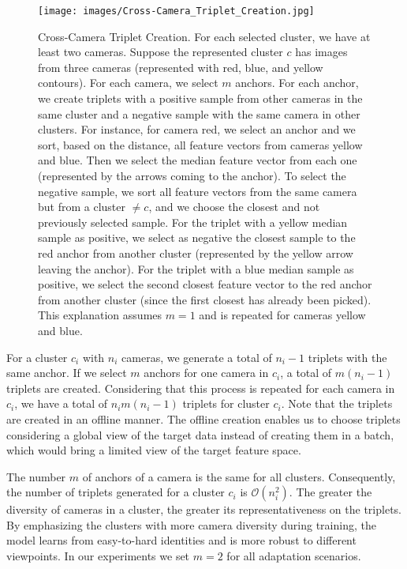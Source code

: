\documentclass[journal]{IEEEtran}
\begin{document}
\begin{figure}[ht]
\centering
\texttt{[image: images/Cross-Camera\_Triplet\_Creation.jpg]}
\caption{Cross-Camera Triplet Creation. For each selected cluster, we have at least two cameras. Suppose the represented cluster $c$ has images from three cameras (represented with red, blue, and yellow contours). For each camera, we select $m$ anchors. For each anchor, we create triplets with a positive sample from other cameras in the same cluster and a negative sample with the same camera in other clusters. For instance, for camera red, we select an anchor and we sort, based on the distance, all feature vectors from cameras yellow and blue. Then we select the median feature vector from each one (represented by the arrows coming to the anchor). To select the negative sample, we sort all feature vectors from the same camera but from a cluster $\neq c$, and we choose the closest and not previously selected sample. For the triplet with a yellow median sample as positive, we select as negative the closest sample to the red anchor from another cluster (represented by the yellow arrow leaving the anchor). For the triplet with a blue median sample as positive, we select the second closest feature vector to the red anchor from another cluster (since the first closest has already been picked). This explanation assumes $m = 1$ and is repeated for cameras yellow and blue.}
\label{fig:cross_camera_triplet_creation}
\end{figure}

For a cluster $c_i$ with $n_i$ cameras, we generate a total of $n_i - 1$ triplets with the same anchor. If we select $m$ anchors for one camera in $c_i$, a total of $ m (n_i - 1)$ triplets are created. 
Considering that this process is repeated for each camera in $c_i$, we have a total of $n_i m (n_i - 1)$ triplets for cluster $c_i$.
Note that the triplets are created in an offline manner. The offline creation enables us to choose triplets considering a global view of the target data instead of creating them in a batch, which would bring a limited view of the target feature space. 





The number $m$ of anchors of a camera is the same for all clusters. Consequently, the number of triplets generated for a cluster $c_i$ is $\mathcal{O}(n_i^2)$. The greater the diversity of cameras in a cluster, the greater its representativeness on the triplets. By emphasizing the clusters with more camera diversity during training, the model learns from easy-to-hard identities and is more robust to different viewpoints. In our experiments we set $m = 2$ for all adaptation scenarios.
\end{document}
